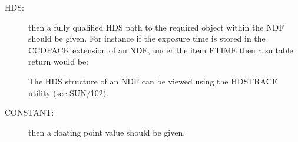 \documentclass[twoside,11pt]{article}
\newcommand{\xref}[3]{#1}
\renewcommand{\_}{\texttt{\symbol{95}}}
\begin{document}
{{{        \begin{description}
        \item[HDS:] then a fully qualified HDS path to the required object
          within the NDF should be given. For instance if the exposure
          time is stored in the CCDPACK extension of an NDF, under the
          item ETIME then a suitable return would be:
        The HDS structure of an NDF can be viewed using the HDSTRACE
        utility (see \xref{SUN/102}{sun102}{}).

        \item[CONSTANT:] then a floating point value should be given.


\end{description}}}}
\end{document}
